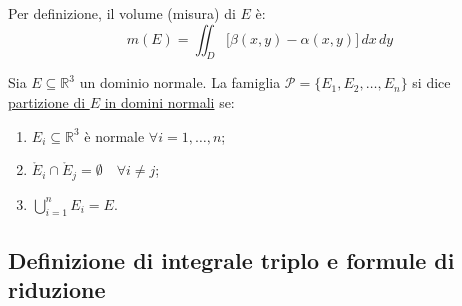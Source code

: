 \begin{definition}
\begin{center}
\end{center}

Per definizione, il volume (misura) di $E$ è:
\[
m(E) = \iint_D \big[ \beta(x, y) - \alpha(x, y) \big]\, dx\, dy
\]
\end{definition}

\begin{definition}
Sia $E \subseteq \mathbb{R}^3$ un dominio normale. La famiglia $\mathcal{P} = \{ E_1, E_2, \dots, E_n \}$ si dice \underline{partizione di $E$ in domini normali} se:
\begin{enumerate}
    \item $E_i \subseteq \mathbb{R}^3$ è normale $\forall i = 1, \dots, n$;
    \item $\mathring{E}_i \cap \mathring{E}_j = \emptyset \quad \forall i \neq j$;
    \item $\displaystyle\bigcup_{i=1}^n E_i = E$.
\end{enumerate}
\end{definition}


\subsection{Definizione di integrale triplo e formule di riduzione}

